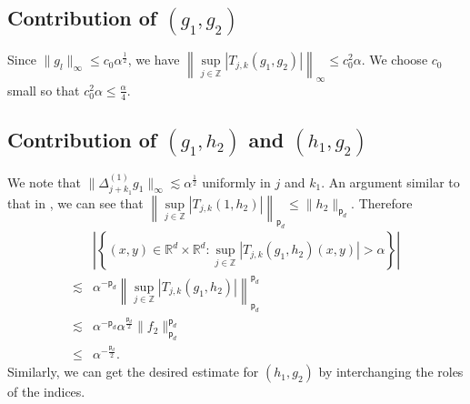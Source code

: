 \documentclass[a4paper,reqno]{amsart}
\theoremstyle{definition}
\theoremstyle{remark}
\numberwithin{equation}{section}
\newcommand{\R}{{\mathbb {R}}}
\newcommand{\Z}{{\mathbb Z}}
\begin{document}
	\subsection*{Contribution of $(g_1,g_2)$}
	Since $\|g_l\|_\infty\leq c_0\alpha^{\frac{1}{2}}$, we have $\left\|\sup\limits_{j\in\Z}|T_{j,k}(g_1,g_2)|\right\|_\infty\leq c_0^2\alpha$. We choose $c_0$ small so that $c_0^2\alpha\leq\frac{\alpha}{4}$.
	\subsection*{Contribution of $(g_1,h_2)$ and $(h_1,g_2)$}
	We note that $\|\Delta_{j+k_1}^{(1)}g_1\|_\infty\lesssim\alpha^\frac{1}{2}$ uniformly in $j$ and $k_1$. An argument similar to that in , we can see that $\left\|\sup\limits_{j\in\Z}|T_{j,k}(1,h_2)|\right\|_{{\mathsf{p}_d}}\leq \|h_2\|_{{\mathsf{p}_d}}$. Therefore
	\begin{align*}
		&\left|\left\{(x,y)\in\R^d\times\R^d:\sup_{j\in\Z}|T_{j,k}(g_1,h_2)(x,y)|>\alpha\right\}\right|\\
		\lesssim&\alpha^{-{\mathsf{p}_d}}\left\|\sup\limits_{j\in\Z}|T_{j,k}(g_1,h_2)|\right\|_{\mathsf{p}_d}^{\mathsf{p}_d}\\
		\lesssim&\alpha^{-{\mathsf{p}_d}}\alpha^\frac{\mathsf{p}_d}{2}\|f_2\|_{\mathsf{p}_d}^{\mathsf{p}_d}\\
		\leq& \alpha^{-\frac{\mathsf{p}_d}{2}}.
	\end{align*}
	Similarly, we can get the desired estimate for $(h_1,g_2)$ by interchanging the roles of the indices.
	
\end{document}
